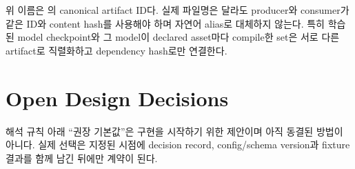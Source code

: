 \documentclass[10pt]{article}
\begin{document}
위 이름은 의 canonical artifact ID다. 실제 파일명은 달라도 producer와 consumer가
같은 ID와 content hash를 사용해야 하며 자연어 alias로 대체하지 않는다. 특히 학습된 model checkpoint와
그 model이 declared asset마다 compile한  set은 서로 다른 artifact로 직렬화하고
dependency hash로만 연결한다.

\section{Open Design Decisions}
\label{sec:r0-chapter-5}

\begin{decisionbox}{해석 규칙}
아래 ``권장 기본값''은 구현을 시작하기 위한 제안이며 아직 동결된 방법이 아니다.
실제 선택은 지정된 시점에 decision record, config/schema version과 fixture 결과를 함께 남긴 뒤에만 계약이 된다.
\end{decisionbox}
\end{document}
